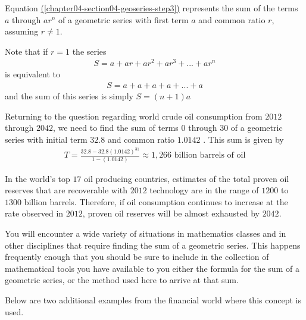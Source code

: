 \documentclass[10pt,]{book}
\theoremstyle{plain}
\theoremstyle{definition}
\theoremstyle{definition}
\theoremstyle{definition}
\numberwithin{equation}{section}
\begin{document}
%
\par
\hypertarget{p-146}{}%
Equation \hyperref[chapter04-section04-geoseries-step3]{(\ref{chapter04-section04-geoseries-step3})} represents the sum of the terms \(a\) through \(ar^n\) of a geometric series with first term \(a\) and common ratio \(r\), assuming \(r \neq 1\).%
\par
\hypertarget{p-147}{}%
Note that if \(r=1\) the series%
\begin{gather*}
S = a + ar + ar^2 + ar^3 + ... + ar^n
\end{gather*}
is equivalent to%
\begin{gather*}
S = a + a + a + a + ... + a
\end{gather*}
and the sum of this series is simply \(S=(n+1)a\)%
\par
\hypertarget{p-148}{}%
Returning to the question regarding world crude oil consumption from \(2012\) through \(2042\), we need to find the sum of terms \(0\) through \(30\) of a geometric series with initial term \(32.8\) and common ratio \(1.0142\) .  This sum is given by%
\begin{gather*}
T = \frac{32.8-32.8(1.0142)^{31}}{1-(1.0142)} \approx 1,266 \text{ billion barrels of oil} 
\end{gather*}
%
\par
\hypertarget{p-149}{}%
In the world’s top \(17\) oil producing countries, estimates of the total proven oil reserves that are recoverable with \(2012\) technology are in the range of \(1200\) to \(1300\) billion barrels.  Therefore, if oil consumption continues to increase at the rate observed in \(2012\), proven oil reserves will be almost exhausted by \(2042\).%
\par
\hypertarget{p-150}{}%
You will encounter a wide variety of situations in mathematics classes and in other disciplines that require finding the sum of a geometric series. This happens frequently enough that you should be sure to include in the collection of mathematical tools you have available to you either the formula for the sum of a geometric series, or the method used here to arrive at that sum.%
\par
\hypertarget{p-151}{}%
Below are two additional examples from the financial world where this concept is used.%
\end{document}
